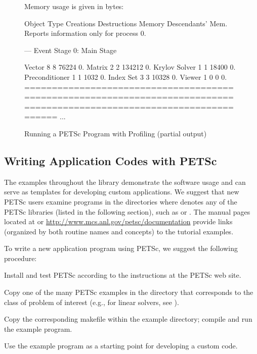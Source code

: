 {{\begin{figure}[H]
{\begin{outputlisting}[\fontsize{7.5pt}{8pt}\ttfamily]
Memory usage is given in bytes:

Object Type          Creations   Destructions     Memory  Descendants' Mem.
Reports information only for process 0.

--- Event Stage 0: Main Stage

              Vector     8              8        76224     0.
              Matrix     2              2       134212     0.
       Krylov Solver     1              1        18400     0.
      Preconditioner     1              1         1032     0.
           Index Set     3              3        10328     0.
              Viewer     1              0            0     0.
========================================================================================================================
...
\end{outputlisting}
}
\nobreak
\caption{Running a PETSc Program with Profiling (partial output)}
\label{fig_exprof}
\end{figure}

\subsection*{Writing Application Codes with PETSc}

The examples throughout the library demonstrate the software usage
and can serve as templates for developing
custom applications.  We suggest that new PETSc
users examine programs in the directories
where 
denotes any of the PETSc libraries (listed in the following
section), such as  or .
The manual pages located at  or 
\href{http://www.mcs.anl.gov/petsc/documentation}{http://www.mcs.anl.gov/petsc/documentation}
provide links (organized by both routine names and concepts) to the tutorial examples.

To write a new application program using PETSc, we suggest the
following procedure:
\begin{tightenumerate}
\item Install and test PETSc according to the instructions at the PETSc web site.
\item Copy one of the many PETSc examples in the directory
      that corresponds to the class of problem of interest (e.g.,
      for linear solvers, see ).
\item Copy the corresponding makefile within the example directory;
      compile and run the example program.
\item Use the example program as a starting point for developing a custom code.
\end{tightenumerate}

}}
